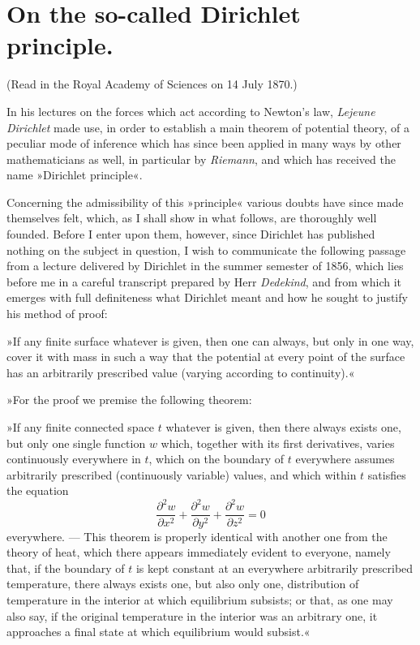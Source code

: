 \documentclass{article}
\begin{document}

\section*{On the so-called Dirichlet principle.}

(Read in the Royal Academy of Sciences on 14 July 1870.)

In his lectures on the forces which act according to Newton's law, \emph{Lejeune Dirichlet} made use, in order to establish a main theorem of potential theory, of a peculiar mode of inference which has since been applied in many ways by other mathematicians as well, in particular by \emph{Riemann}, and which has received the name »Dirichlet principle«.

Concerning the admissibility of this »principle« various doubts have since made themselves felt, which, as I shall show in what follows, are thoroughly well founded. Before I enter upon them, however, since Dirichlet has published nothing on the subject in question, I wish to communicate the following passage from a lecture delivered by Dirichlet in the summer semester of 1856, which lies before me in a careful transcript prepared by Herr \emph{Dedekind}, and from which it emerges with full definiteness what Dirichlet meant and how he sought to justify his method of proof:

»If any finite surface whatever is given, then one can always, but only in one way, cover it with mass in such a way that the potential at every point of the surface has an arbitrarily prescribed value (varying according to continuity).«

»For the proof we premise the following theorem:

»If any finite connected space $t$ whatever is given, then there always exists one, but only one single function $w$ which, together with its first derivatives, varies continuously everywhere in $t$, which on the boundary of $t$ everywhere
assumes arbitrarily prescribed (continuously variable) values, and which within $t$ satisfies the equation
\[
\frac{\partial^{2}w}{\partial x^{2}} + \frac{\partial^{2}w}{\partial y^{2}} + \frac{\partial^{2}w}{\partial z^{2}} = 0
\]
everywhere. --- This theorem is properly identical with another one from the theory of heat, which there appears immediately evident to everyone, namely that, if the boundary of $t$ is kept constant at an everywhere arbitrarily prescribed temperature, there always exists one, but also only one, distribution of temperature in the interior at which equilibrium subsists; or that, as one may also say, if the original temperature in the interior was an arbitrary one, it approaches a final state at which equilibrium would subsist.«
\end{document}
